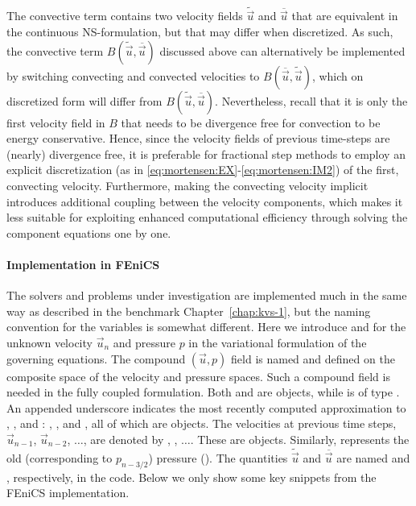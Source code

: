 The convective term contains two velocity fields $\tilde{\vec{u}}$ and
$\overline{\vec{u}}$ that are equivalent in the continuous
NS-formulation, but that may differ when discretized. As such, the
convective term $B(\tilde{\vec{u}},\overline{\vec{u}})$ discussed
above can alternatively be implemented by switching convecting and
convected velocities to $B(\overline{\vec{u}},\tilde{\vec{u}})$, which
on discretized form will differ from
$B(\tilde{\vec{u}},\overline{\vec{u}})$. Nevertheless, recall that it
is only the first velocity field in $B$ that needs to be divergence
free for convection to be energy conservative. Hence, since the
velocity fields of previous time-steps are (nearly) divergence free,
it is preferable for fractional step methods to employ an explicit
discretization (as in
\eqref{eq:mortensen:EX}-\eqref{eq:mortensen:IM2}) of the first,
convecting velocity. Furthermore, making the convecting velocity
implicit introduces additional coupling between the velocity
components, which makes it less suitable for exploiting enhanced
computational efficiency through solving the component equations one
by one.

\paragraph{Implementation in FEniCS}
\label{sec:mortensen:impl_fenics}

The solvers and problems under investigation are implemented much in
the same way as described in the benchmark Chapter~\ref{chap:kvs-1},
but the naming convention for the variables is somewhat
different. Here we introduce  and  for the unknown
velocity $\vec{u}_n$ and pressure $p$ in the variational formulation
of the governing equations. The compound $(\vec{u},p)$ field is named
 and defined on the composite space of the velocity and
pressure spaces. Such a compound field is needed in the fully coupled
formulation.  Both  and  are 
objects, while  is of type .  An appended
underscore indicates the most recently computed approximation to
, , and : , , and ,
all of which are  objects. The velocities at previous
time steps, $\vec{u}_{n-1}$, $\vec{u}_{n-2}$, $\ldots$, are denoted by
, , $\ldots$. These are 
objects. Similarly,  represents the old (corresponding to
$p_{n-3/2}$) pressure (). The quantities
$\tilde{\vec{u}}$ and $\overline{\vec{u}}$ are named 
and , respectively, in the code. Below we only show some
key snippets from the FEniCS implementation.

